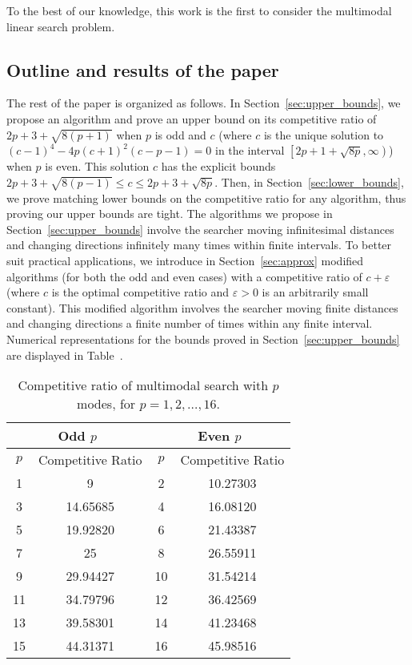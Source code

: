 To the best of our knowledge, this work is the first to consider the multimodal linear search problem.

\subsection{Outline and results of the paper}

The rest of the paper is organized as follows.
In Section~\ref{sec:upper_bounds}, we propose an algorithm and prove an upper bound on its competitive ratio of $2p+3+\sqrt{8(p+1)}$ when $p$ is odd and $c$ (where $c$ is the unique solution to $(c-1)^4-4p(c+1)^2(c-p-1)=0$ in the interval $\left[2p+1+\sqrt{8p},\infty\right)$) when $p$ is even.
This solution $c$ has the explicit bounds $2p+3+\sqrt{8(p-1)}\leq c\leq 2p+3+\sqrt{8p}$.
Then, in Section~\ref{sec:lower_bounds}, we prove matching lower bounds on the competitive ratio for any algorithm, thus proving our upper bounds are tight.
The algorithms we propose in Section~\ref{sec:upper_bounds} involve the searcher moving  infinitesimal distances and changing directions infinitely many times within finite intervals. 
To better suit practical applications, we introduce in Section~\ref{sec:approx}  modified algorithms (for both the odd and even cases) with a competitive ratio of $c + \varepsilon$ (where $c$ is the optimal competitive ratio and $\varepsilon > 0$ is an arbitrarily small constant).
This modified algorithm involves the searcher moving finite distances and changing directions a finite number of times within any finite interval.
Numerical representations for the bounds proved in Section~\ref{sec:upper_bounds} %
are displayed in Table~.
\begin{table}[ht]
\caption{Competitive ratio of multimodal search with $p$ modes, for $p=1,2,\ldots, 16$.}
\centering
\begin{tabular}{|c|c|c|c|}
    \hline
    \multicolumn{2}{|c|}{Odd $p$} & \multicolumn{2}{c|}{Even $p$} \\
    \hline
    $p$ & Competitive Ratio & $p$ & Competitive Ratio \\
    \hline
    1   &   9           &   2   &   10.27303    \\
    3   &   14.65685    &   4   &   16.08120    \\
    5   &   19.92820    &   6   &   21.43387    \\
    7   &   25          &   8   &   26.55911    \\
    9   &   29.94427    &   10  &   31.54214    \\
    11  &   34.79796    &   12  &   36.42569    \\
    13  &   39.58301    &   14  &   41.23468    \\
    15  &   44.31371    &   16  &   45.98516    \\
    \hline
\end{tabular}
\end{table}
